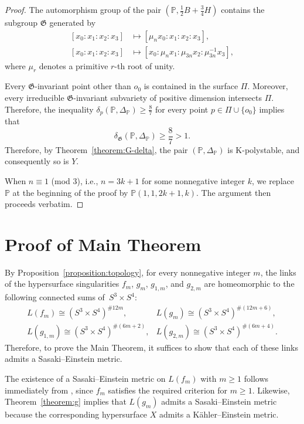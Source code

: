 \documentclass[12pt]{amsart}
\theoremstyle{definition}
\theoremstyle{remark}
\begin{document}
\begin{proof}
The automorphism group of the pair $\left(\mathbb{P},\frac12B+\frac34H\right)$ contains the subgroup $\mathfrak{G}$ generated by
\[
\begin{aligned}
[x_0:x_1:x_2:x_3]
&\longmapsto
[\mu_nx_0:x_1:x_2:x_3],\\
[x_0:x_1:x_2:x_3]
&\longmapsto
[x_0:\mu_nx_1:\mu_{3n}x_2:\mu_{3n}^{-1}x_3],
\end{aligned}
\]
where $\mu_r$ denotes a primitive $r$-th root of unity.

Every $\mathfrak{G}$-invariant point other than $o_0$ is contained in the surface $\Pi$. Moreover, every irreducible $\mathfrak{G}$-invariant subvariety of positive dimension intersects $\Pi$. Therefore, the inequality
$
\delta_p\left(\mathbb{P},\Delta_\mathbb{P}\right)\geq\frac{8}{7}
$
for every point $p\in\Pi\cup\{o_0\}$ implies that \[
\delta_\mathfrak{G}\left(\mathbb{P},\Delta_\mathbb{P}\right)\geq\frac{8}{7}>1.
\]
Therefore, by Theorem~\ref{theorem:G-delta}, the pair $(\mathbb{P},\Delta_\mathbb{P})$ is K-polystable, and consequently so is $Y$.



When  $n\equiv 1$  (mod $3$), i.e., $n=3k+1$ for some nonnegative integer $k$, we replace $\mathbb{P}$ at the beginning of the proof by $\mathbb{P}(1,1,2k+1,k)$. The argument then proceeds verbatim.
\end{proof}




\section{Proof of Main Theorem}


By Proposition~\ref{proposition:topology}, for every nonnegative integer $m$, 
the links of the hypersurface singularities $f_{m}$, $g_m$, $g_{1,m}$, and $g_{2,m}$ are homeomorphic to the following connected sums of~$S^3\times S^4$:
\[
\begin{array}{ll}
L(f_{m})\cong  (S^3\times S^4)^{\#12m},& 
L(g_m)\cong (S^3\times S^4)^{\#(12m+6)},\\
L(g_{1,m})\cong (S^3\times S^4)^{\#(6m+2)},&
L(g_{2, m})\cong  (S^3\times S^4)^{\#(6m+4)}.
\end{array}
\]
Therefore, to prove the Main Theorem, it suffices to show that each of these links admits a Sasaki--Einstein metric.

The existence of a Sasaki--Einstein metric on $L(f_{m})$  with $m\geq 1$ follows immediately from \cite[Theorem~1.4]{LST25}, since $f_{m}$ satisfies the required criterion for $m\geq 1$. Likewise, Theorem~\ref{theorem:g} implies that $L(g_m)$ admits a Sasaki--Einstein metric because the corresponding hypersurface $X$ admits a K\"ahler--Einstein metric.
\end{document}
